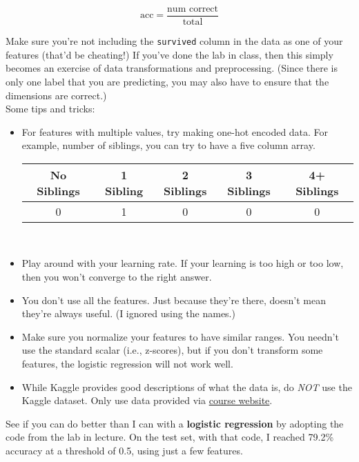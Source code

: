 \documentclass[paper=a4, fontsize=11pt]{scrartcl} %
\begin{document}
\begin{equation}
    \text{acc} = \frac{\text{num correct}}{\text{total}}
\end{equation}

Make sure you're not including the \verb"survived" column in the data as one of your features (that'd be cheating!) If you've done the lab in class, then this simply becomes an exercise of data transformations and preprocessing. (Since there is only one label that you are predicting, you may also have to ensure that the dimensions are correct.) \\

Some tips and tricks:

\begin{itemize}
    \item For features with multiple values, try making one-hot encoded data. For example, number of siblings, you can try to have a five column array. \\
    
    \begin{tabular}{|c|c|c|c|c|}
        \hline
         No Siblings & 1 Sibling & 2 Siblings & 3 Siblings & 4+ Siblings  \\
         \hline
                0    &    1      &      0     &       0  &    0\\
        \hline
    \end{tabular} \\
    \item Play around with your learning rate. If your learning is too high or too low, then you won't converge to the right answer.
    \item You don't use all the features. Just because they're there, doesn't mean they're always useful. (I ignored using the names.)
    \item Make sure you normalize your features to have similar ranges. You needn't use the standard scalar (i.e., z-scores), but if you don't transform some features, the logistic regression will not work well.
    \item While Kaggle provides good descriptions of what the data is, do \emph{NOT} use the Kaggle dataset. Only use data provided via \href{https://course.ccs.neu.edu/cs6220/homework-5/}{course website}.
\end{itemize}

See if you can do better than I can with a \textbf{logistic regression} by adopting the code from the lab in lecture. On the test set, with that code, I reached 79.2\% accuracy at a threshold of 0.5, using just a few features. \\
\end{document}
